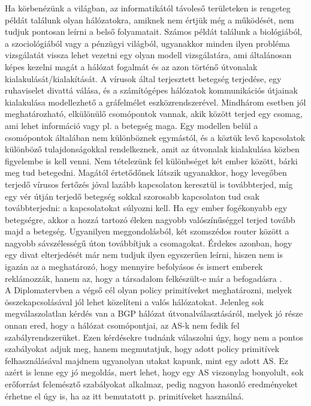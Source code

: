 Ha körbenézünk a világban, az informatikától távoleső területeken is rengeteg példát találunk olyan hálózatokra, amiknek nem értjük még a működését, nem tudjuk pontosan leírni a belső folyamatait. Számos példát találunk a biológiából, a szociológiából vagy a pénzügyi világból, ugyanakkor minden ilyen probléma vizsgálatát vissza lehet vezetni egy olyan modell vizsgálatára, ami általánosan képes kezelni magát a hálózat fogalmát és az azon történő útvonalak kialakulását/kialakítását. A vírusok által terjesztett betegség terjedése, egy ruhaviselet divattá válása, és a számítógépes hálózatok kommunikációs útjainak kialakulása modellezhető a gráfelmélet eszközrendszerével. Mindhárom esetben jól meghatározható, elkülönülő csomópontok vannak, akik között terjed egy csomag, ami lehet információ vagy pl. a betegség maga. Egy modellen belül a csomópontok általában nem különböznek egymástól, és a köztük levő kapcsolatok különböző tulajdonságokkal rendelkeznek, amit az útvonalak kialakulása közben figyelembe is kell venni. Nem tételezünk fel különbséget két ember között, bárki meg tud betegedni. Magától értetődőnek látszik ugyanakkor, hogy levegőben terjedő vírusos fertőzés jóval lazább kapcsolaton keresztül is továbbterjed, míg egy vér útján terjedő betegség sokkal szorosabb kapcsolaton tud csak továbbterjedni: a kapcsolatokat súlyozni kell. Ha egy ember fogékonyabb egy betegségre, akkor a hozzá tartozó éleken nagyobb valószínűséggel terjed tovább majd a betegség. Ugyanilyen meggondolásból, két szomszédos router között a nagyobb sávszélességű úton továbbítjuk a csomagokat. Érdekes azonban, hogy egy divat elterjedését már nem tudjuk ilyen egyszerűen leírni, hiszen nem is igazán az a meghatározó, hogy mennyire befolyásos és ismert emberek reklámozzák, hanem az, hogy a társadalom felkészült-e már a befogadásra \cite{DuncanWatts, DobreiMScOnlab1}.\\

A Diplomatervben a végső cél olyan policy primitíveket meghatározni, melyek összekapcsolásával jól lehet közelíteni a valós hálózatokat. Jelenleg sok megválaszolatlan kérdés van a BGP hálózat útvonalválasztásáról, melyek jó része onnan ered, hogy a hálózat csomópontjai, az AS-k nem fedik fel szabályrendszerüket. Ezen kérdésekre tudnánk válaszolni úgy, hogy nem a pontos szabályokat adjuk meg, hanem megmutatjuk, hogy adott policy primitívek felhasználásával majdnem ugyanolyan utakat kapunk, mint egy adott AS. Ez azért is lenne egy jó megoldás, mert lehet, hogy egy AS viszonylag bonyolult, sok erőforrást felemésztő szabályokat alkalmaz, pedig nagyon hasonló eredményeket érhetne el úgy is, ha az itt bemutatott p. primitíveket használná.\\

